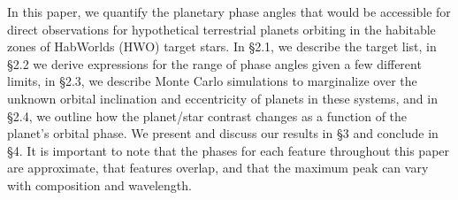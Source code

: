 \documentclass[
    usenatbib,
]{mnras}
\begin{document}
In this paper, we quantify the planetary phase angles that would be accessible for direct observations for hypothetical terrestrial planets orbiting in the habitable zones of HabWorlds (HWO) target stars.
%
In \S 2.1, we describe the target list, in \S 2.2 we derive expressions for the range of phase angles given a few different limits, in \S 2.3, we describe Monte Carlo simulations to marginalize over the unknown orbital inclination and eccentricity of planets in these systems, and in \S 2.4, we outline how the planet/star contrast changes as a function of the planet's orbital phase.  
%
We present and discuss our results in \S 3 and conclude in \S 4. It is important to note that the phases for each feature throughout this paper are approximate, that features overlap, and that the maximum peak can vary with composition and wavelength.




 
\end{document}
